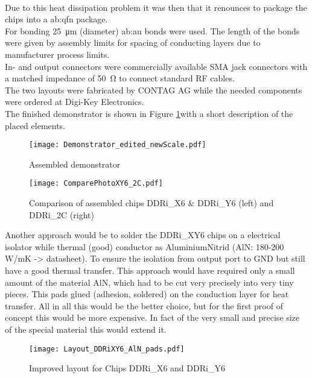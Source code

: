 \\
Due to this heat dissipation problem it was then that it renounces to package the chips into a \gls{ab:qfn} package.\\
For bonding \SI{25}{\micro \metre} (diameter) \gls{ab:au} bonds were used.
The length of the bonds were given by assembly limits for spacing of conducting layers  due to manufacturer process limits.\\
In- and output connectors were commercially available SMA jack connectors with a matched impedance of \SI{50}{\ohm} to connect standard RF cables.\\


The two layouts were fabricated by CONTAG AG while the needed components were ordered at Digi-Key Electronics.\\
The finished demonstrator is shown in Figure \ref{fig:assembledDemonstrator}with a short description of the placed elements.

\begin{figure}[htb!]
	\centering
  \texttt{[image: Demonstrator\_edited\_newScale.pdf]}
	\caption{Assembled demonstrator}
	\label{fig:assembledDemonstrator}
\end{figure}

\begin{figure}[htb!]
	\centering
  \texttt{[image: ComparePhotoXY6\_2C.pdf]}
	\caption{Comparison of assembled chips DDRi\_X6 \& DDRi\_Y6 (left) and DDRi\_2C (right)}
	\label{fig:CompareChips}
\end{figure}

\newpage
Another approach would be to solder the DDRi\_XY6 chips on a electrical isolator while thermal (good) conductor as AluminiumNitrid (AlN: 180-200 W/mK -> datasheet). To ensure the isolation from output port to GND but still have a good thermal transfer.
This approach would have required only a small amount of the material AlN, which had to be cut very precisely into very tiny pieces.
This pads glued (adhesion, soldered) on the conduction layer for heat transfer. 
All in all this would be the better choice, but for the first proof of concept this would be more expensive.
In fact of the very small and precise size of the special material this would extend it.


\begin{figure}[htb!]
	\centering
  \texttt{[image: Layout\_DDRiXY6\_AlN\_pads.pdf]}
	\caption{Improved layout for Chips DDRi\_X6 and DDRi\_Y6}
	\label{fig:DDRiXY6AlNpads}
\end{figure}